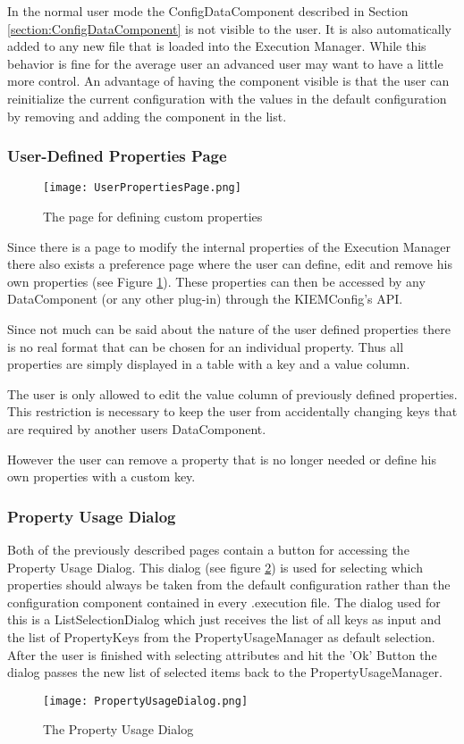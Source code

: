 In the normal user mode the ConfigDataComponent described in Section \ref{section:ConfigDataComponent} is
not visible to the user. It is also automatically added to any new file that is loaded into the Execution Manager.
While this behavior is fine for the average user an advanced user may want to have a little more control. An advantage
of having the component visible is that the user can reinitialize the current configuration with the values in
the default configuration by removing and adding the component in the list.


\subsubsection{User-Defined Properties Page}
\label{section:UserDefinedPropertiesPage}
\begin{figure}
  \centering
  \texttt{[image: UserPropertiesPage.png]}
  \caption[The page for defining custom properties]%
  {The page for defining custom properties\protect}
  \label{fig:UserDefinedPropertiesPage}
\end{figure}
Since there is a page to modify the internal properties of the Execution Manager there also exists a
preference page where the user can define, edit and remove his own properties (see Figure \ref{fig:UserDefinedPropertiesPage}). 
These properties can then be accessed by any DataComponent (or any other plug-in) through the \ac{KIEMConfig}'s \ac{API}.

Since not much can be said about the nature of the user defined properties there is no real format that
can be chosen for an individual property. Thus all properties are simply displayed in a table with a 
key and a value column. 

The user is only allowed to edit the value column of previously defined properties. This restriction is
necessary to keep the user from accidentally changing keys that are required by another users DataComponent.

However the user can remove a property that is no longer needed or define his own properties with a custom key.

\subsubsection{Property Usage Dialog}
Both of the previously described pages contain a button for accessing the Property Usage Dialog.
This dialog (see figure \ref{fig:PropertyUsageDialog}) is used for selecting which properties should always be taken
from the default configuration rather than the configuration component contained in every .execution file.
The dialog used for this is a ListSelectionDialog which just receives the list of
all keys as input and the list of PropertyKeys from the PropertyUsageManager as default selection.
After the user is finished with selecting attributes and hit the 'Ok' Button the dialog
passes the new list of selected items back to the PropertyUsageManager.
\begin{figure}
  \centering
  \texttt{[image: PropertyUsageDialog.png]}
  \caption[Property Usage Dialog]%
  {The Property Usage Dialog\protect}
  \label{fig:PropertyUsageDialog}
\end{figure}

